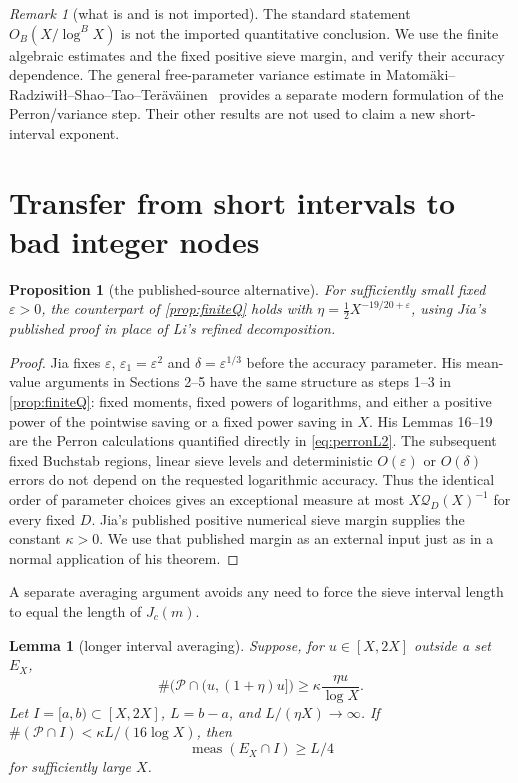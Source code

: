 \documentclass[11pt,a4paper]{article}
\newtheorem{proposition}[theorem]{Proposition}
\newtheorem{lemma}[theorem]{Lemma}
\theoremstyle{remark}
\newtheorem{remark}[theorem]{Remark}
\newcommand{\PP}{\mathcal P}
\newcommand{\meas}{\operatorname{meas}}
\newcommand{\Q}{\mathcal Q}
\newcommand{\eps}{\varepsilon}
\begin{document}
\begin{remark}[what is and is not imported]
The standard statement $O_B(X/\log^B X)$ is not the imported
quantitative conclusion. We use the finite algebraic estimates and
the fixed positive sieve margin, and verify their accuracy dependence.
The general free-parameter variance estimate in
Matomäki--Radziwiłł--Shao--Tao--Teräväinen~\cite[Lemma 3.3]{MRSTT}
provides a separate modern formulation of the Perron/variance step.
Their other results are not used to claim a new short-interval exponent.
\end{remark}

\section{Transfer from short intervals to bad integer nodes}

\begin{proposition}[the published-source alternative]\label{prop:jiaQ}
For sufficiently small fixed $\eps>0$, the counterpart of
\cref{prop:finiteQ} holds with
$\eta=\tfrac12X^{-19/20+\eps}$, using Jia's published proof
in place of Li's refined decomposition.
\end{proposition}

\begin{proof}
Jia fixes $\eps$, $\eps_1=\eps^2$ and $\delta=\eps^{1/3}$ before
the accuracy parameter. His mean-value arguments in Sections 2--5
have the same structure as steps 1--3 in \cref{prop:finiteQ}:
fixed moments, fixed powers of logarithms, and either a positive
power of the pointwise saving or a fixed power saving in $X$.
His Lemmas 16--19 are the Perron calculations quantified directly
in \eqref{eq:perronL2}. The subsequent fixed Buchstab regions,
linear sieve levels and deterministic $O(\eps)$ or $O(\delta)$
errors do not depend on the requested logarithmic accuracy.
Thus the identical order of parameter choices gives an exceptional
measure at most $X\Q_D(X)^{-1}$ for every fixed $D$.
Jia's published positive numerical sieve margin supplies the
constant $\kappa>0$. We use that published margin as an external
input just as in a normal application of his theorem.
\end{proof}

A separate averaging argument avoids any need to force the sieve
interval length to equal the length of $J_c(m)$.

\begin{lemma}[longer interval averaging]\label{lem:average}
Suppose, for $u\in[X,2X]$ outside a set $E_X$,
\[
       \#\bigl(\PP\cap(u,(1+\eta)u]\bigr)
                       \ge\kappa\frac{\eta u}{\log X}.
\]
Let $I=[a,b)\subset[X,2X]$, $L=b-a$, and $L/(\eta X)\to\infty$.
If $\#(\PP\cap I)<\kappa L/(16\log X)$, then
\[
                         \meas(E_X\cap I)\ge L/4
\]
for sufficiently large $X$.
\end{lemma}
\end{document}
